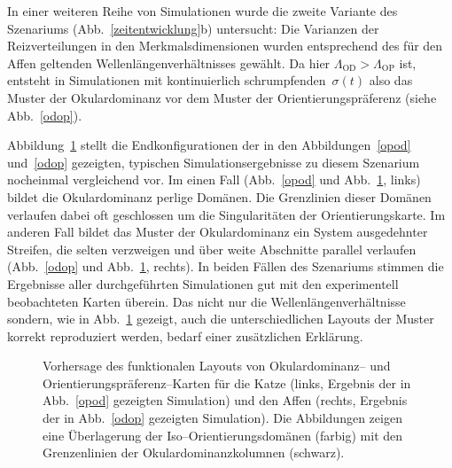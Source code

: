In einer weiteren Reihe von Simulationen wurde die zweite Variante des
Szenariums (Abb.~\ref{zeitentwicklung}b) untersucht: Die Varianzen der
Reizverteilungen in den Merkmalsdimensionen wurden entsprechend des für
den Affen geltenden Wellen\-längen\-ver\-hältnisses gewählt. Da hier
$\Lambda_{\text{OD}} > \Lambda_{\text{OP}}$ ist, entsteht in Simulationen
mit kontinuierlich schrumpfenden~$\sigma(t)$ also das Muster der
Okulardominanz vor dem Muster der Orientierungspräferenz (siehe
Abb.~\ref{odop}).

Abbildung~\ref{simres} stellt die Endkonfigurationen der in den
Abbildungen~\ref{opod} und~\ref{odop} gezeigten, typischen
Simulationsergebnisse zu diesem Szenarium nocheinmal vergleichend vor. Im
einen Fall (Abb.~\ref{opod} und Abb.~\ref{simres}, links) bildet die
Okulardominanz perlige Domänen. Die Grenzlinien dieser Domänen verlaufen
dabei oft geschlossen um die Singularitäten der Orientierungskarte. Im
anderen Fall bildet das Muster der Okulardominanz ein System ausgedehnter
Streifen, die selten verzweigen und über weite Abschnitte parallel
verlaufen (Abb.~\ref{odop} und Abb.~\ref{simres}, rechts).
In beiden Fällen des Szenariums stimmen die Ergebnisse aller durchgeführten
Simulationen gut mit den experimentell beobachteten Karten überein. Das
nicht nur die Wellenlängenverhältnisse sondern, wie in Abb.~\ref{simres}
gezeigt, auch die unterschiedlichen Layouts der Muster korrekt reproduziert
werden, bedarf einer zusätzlichen Erklärung.

\begin{figure}[t]
    \centering
    \begin{minipage}[t]{6.2cm}
    \end{minipage}
    \hskip0.4cm
    \begin{minipage}[t]{6.2cm}
    \end{minipage}
    \caption{Vorhersage des funktionalen Layouts von Okulardominanz-- und
    Ori\-en\-tie\-rungs\-präferenz--Karten für die Katze (links, Ergebnis der in
    Abb.~\ref{opod} gezeigten Simulation) und den Affen (rechts, Ergebnis der
    in Abb.~\ref{odop} gezeigten Simulation). Die Abbildungen zeigen eine
    Überlagerung der Iso--Orientierungsdomänen (farbig) mit den Grenzenlinien
    der Okulardominanzkolumnen (schwarz).}
    \label{simres}
\end{figure}

